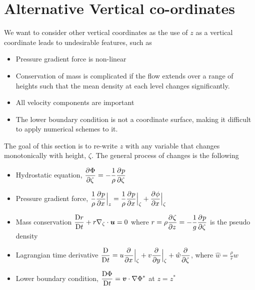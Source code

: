 \section{Alternative Vertical co-ordinates} 
We want to consider other vertical coordinates as the use of $z$ as a vertical coordinate leads to undesirable features, such as 
\begin{itemize}
    \item Pressure gradient force is non-linear
    \item Conservation of mass is complicated if the flow extends over a range of heights such that the mean density at each level changes significantly. 
    \item All velocity components are important 
    \item The lower boundary condition is not a coordinate surface, making it difficult to apply numerical schemes to it.
\end{itemize}
The goal of this section is to re-write $z$ with any variable that changes monotonically with height, $\zeta$. The general process of changes is the following 
\begin{itemize}
    \item Hydrostatic equation, $\displaystyle \frac{\partial^{} \Phi}{\partial \zeta^{}}=-\frac{1}{\rho}\displaystyle \frac{\partial^{} p}{\partial \zeta^{}}$
    \item Pressure gradient force, $\displaystyle \frac{1}{\rho}\displaystyle \frac{\partial^{} p}{\partial x^{}}\Bigr|_z = \frac{1}{\rho}\displaystyle \frac{\partial^{} p}{\partial x^{}}\Bigr|_\zeta+\displaystyle \frac{\partial^{} \phi}{\partial x^{}}\Bigr|_\zeta$
    \item Mass conservation $\displaystyle \displaystyle \frac{{\rm D} r}{{\rm D} t}+r\nabla_\zeta\cdot\bm{u}=0$ where $\displaystyle r=\rho\displaystyle \frac{\partial^{} \zeta}{\partial z^{}}=-\frac{1}{g}\displaystyle \frac{\partial^{} p}{\partial \zeta^{}}$ is the pseudo density 
    \item Lagrangian time derivative $\displaystyle \displaystyle \frac{{\rm D} }{{\rm D} t} = u\displaystyle \frac{\partial^{} }{\partial x^{}}\Bigr|_\zeta+v\displaystyle \frac{\partial^{} }{\partial y^{}}\Bigr|_\zeta +\hat{w}\displaystyle \frac{\partial^{} }{\partial \zeta^{}}$, where $\displaystyle \hat{w}=\frac{\rho}{r}w$
    \item Lower boundary condition, $\displaystyle \frac{{\rm D} \Phi}{{\rm D} t}=\bm{v}\cdot\nabla\Phi^*$ at $z=z^*$
\end{itemize}
